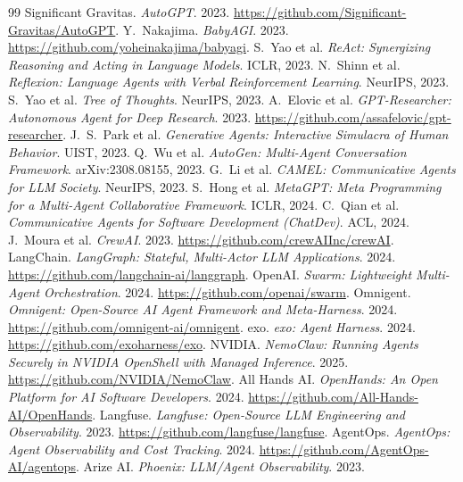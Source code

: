 \documentclass[10pt,twocolumn]{article}
\begin{document}
\begin{thebibliography}{99}
\small
{} Significant Gravitas. \emph{AutoGPT}. 2023.
\url{https://github.com/Significant-Gravitas/AutoGPT}.
 Y.\ Nakajima. \emph{BabyAGI}. 2023.
\url{https://github.com/yoheinakajima/babyagi}.
 S.\ Yao et al. \emph{ReAct: Synergizing Reasoning and Acting in Language
Models}. ICLR, 2023.
 N.\ Shinn et al. \emph{Reflexion: Language Agents with Verbal
Reinforcement Learning}. NeurIPS, 2023.
 S.\ Yao et al. \emph{Tree of Thoughts}. NeurIPS, 2023.
 A.\ Elovic et al. \emph{GPT-Researcher: Autonomous Agent for
Deep Research}. 2023. \url{https://github.com/assafelovic/gpt-researcher}.
 J.\ S.\ Park et al. \emph{Generative Agents: Interactive Simulacra
of Human Behavior}. UIST, 2023.
 Q.\ Wu et al. \emph{AutoGen: Multi-Agent Conversation Framework}.
arXiv:2308.08155, 2023.
 G.\ Li et al. \emph{CAMEL: Communicative Agents for LLM Society}.
NeurIPS, 2023.
 S.\ Hong et al. \emph{MetaGPT: Meta Programming for a Multi-Agent
Collaborative Framework}. ICLR, 2024.
 C.\ Qian et al. \emph{Communicative Agents for Software Development
(ChatDev)}. ACL, 2024.
 J.\ Moura et al. \emph{CrewAI}. 2023.
\url{https://github.com/crewAIInc/crewAI}.
 LangChain. \emph{LangGraph: Stateful, Multi-Actor LLM
Applications}. 2024. \url{https://github.com/langchain-ai/langgraph}.
 OpenAI. \emph{Swarm: Lightweight Multi-Agent Orchestration}. 2024.
\url{https://github.com/openai/swarm}.
 Omnigent. \emph{Omnigent: Open-Source AI Agent Framework and
Meta-Harness}. 2024. \url{https://github.com/omnigent-ai/omnigent}.
 exo. \emph{exo: Agent Harness}. 2024.
\url{https://github.com/exoharness/exo}.
 NVIDIA. \emph{NemoClaw: Running Agents Securely in NVIDIA OpenShell
with Managed Inference}. 2025. \url{https://github.com/NVIDIA/NemoClaw}.
 All Hands AI. \emph{OpenHands: An Open Platform for AI Software
Developers}. 2024. \url{https://github.com/All-Hands-AI/OpenHands}.
 Langfuse. \emph{Langfuse: Open-Source LLM Engineering and
Observability}. 2023. \url{https://github.com/langfuse/langfuse}.
 AgentOps. \emph{AgentOps: Agent Observability and Cost Tracking}.
2024. \url{https://github.com/AgentOps-AI/agentops}.
 Arize AI. \emph{Phoenix: LLM/Agent Observability}. 2023.

\end{thebibliography}
\end{document}
